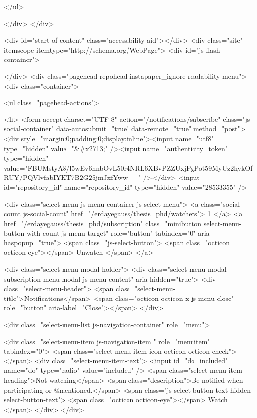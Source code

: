 </ul>


    
  </div>
</div>

        

        


      <div id="start-of-content" class="accessibility-aid"></div>
          <div class="site" itemscope itemtype="http://schema.org/WebPage">
    <div id="js-flash-container">
      
    </div>
    <div class="pagehead repohead instapaper_ignore readability-menu">
      <div class="container">
        
<ul class="pagehead-actions">

  <li>
      <form accept-charset="UTF-8" action="/notifications/subscribe" class="js-social-container" data-autosubmit="true" data-remote="true" method="post"><div style="margin:0;padding:0;display:inline"><input name="utf8" type="hidden" value="&#x2713;" /><input name="authenticity_token" type="hidden" value="FBUMstyA8/l5wEv6nnbOvL50r4NRL6XBvPZZUxjPgPot59MyUz2hykOfRUY/PQVlvfabIYKT7B2G25jmJxfYww==" /></div>    <input id="repository_id" name="repository_id" type="hidden" value="28533355" />

      <div class="select-menu js-menu-container js-select-menu">
        <a class="social-count js-social-count" href="/erdayegauss/thesis_phd/watchers">
          1
        </a>
        <a href="/erdayegauss/thesis_phd/subscription"
          class="minibutton select-menu-button with-count js-menu-target" role="button" tabindex="0" aria-haspopup="true">
          <span class="js-select-button">
            <span class="octicon octicon-eye"></span>
            Unwatch
          </span>
        </a>

        <div class="select-menu-modal-holder">
          <div class="select-menu-modal subscription-menu-modal js-menu-content" aria-hidden="true">
            <div class="select-menu-header">
              <span class="select-menu-title">Notifications</span>
              <span class="octicon octicon-x js-menu-close" role="button" aria-label="Close"></span>
            </div>

            <div class="select-menu-list js-navigation-container" role="menu">

              <div class="select-menu-item js-navigation-item " role="menuitem" tabindex="0">
                <span class="select-menu-item-icon octicon octicon-check"></span>
                <div class="select-menu-item-text">
                  <input id="do_included" name="do" type="radio" value="included" />
                  <span class="select-menu-item-heading">Not watching</span>
                  <span class="description">Be notified when participating or @mentioned.</span>
                  <span class="js-select-button-text hidden-select-button-text">
                    <span class="octicon octicon-eye"></span>
                    Watch
                  </span>
                </div>
              </div>

